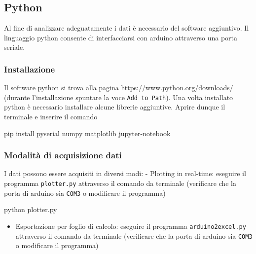 \documentclass[11pt]{article}
\providecommand{\tightlist}{%
      \setlength{\itemsep}{0pt}\setlength{\parskip}{0pt}}
\newenvironment{Shaded}{}{}
\newcommand{\NormalTok}[1]{{#1}}
\newcommand{\ExtensionTok}[1]{{#1}}
\begin{document}
    \hypertarget{python}{%
\subsection{Python}\label{python}}

Al fine di analizzare adeguatamente i dati è necessario del software
aggiuntivo. Il linguaggio python consente di interfacciarsi con arduino
attraverso una porta seriale.

\hypertarget{installazione}{%
\subsubsection{Installazione}\label{installazione}}

Il software python si trova alla pagina
https://www.python.org/downloads/ (durante l'installazione spuntare la
voce \texttt{Add\ to\ Path}). Una volta installato python è necessario
installare alcune librerie aggiuntive. Aprire dunque il terminale e
inserire il comando

\begin{Shaded}
\begin{Highlighting}[]
\ExtensionTok{pip}\NormalTok{ install pyserial numpy matplotlib jupyter-notebook}
\end{Highlighting}
\end{Shaded}

\hypertarget{modalituxe0-di-acquisizione-dati}{%
\subsubsection{Modalità di acquisizione
dati}\label{modalituxe0-di-acquisizione-dati}}

I dati possono essere acquisiti in diversi modi: - Plotting in
real-time: eseguire il programma \texttt{plotter.py} attraverso il
comando da terminale (verificare che la porta di arduino sia
\texttt{COM3} o modificare il programma)

\begin{Shaded}
\begin{Highlighting}[]
\ExtensionTok{python}\NormalTok{ plotter.py}
\end{Highlighting}
\end{Shaded}

\begin{itemize}
\tightlist
\item
  Esportazione per foglio di calcolo: eseguire il programma
  \texttt{arduino2excel.py} attraverso il comando da terminale
  (verificare che la porta di arduino sia \texttt{COM3} o modificare il
  programma)
\end{itemize}
\end{document}
